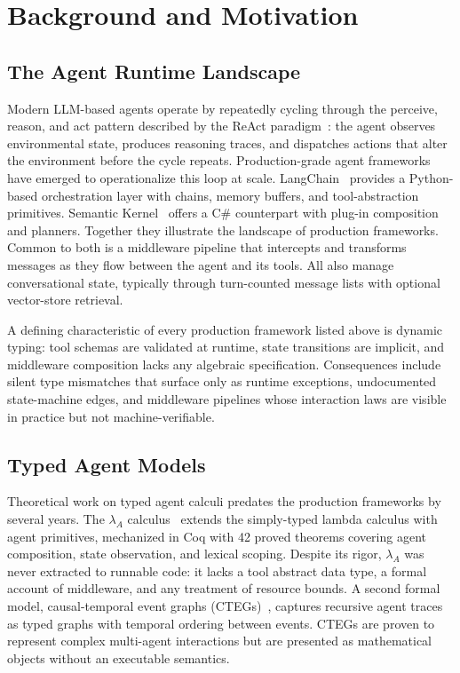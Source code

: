 \section{Background and Motivation}
\label{sec:background}

\subsection{The Agent Runtime Landscape}
\label{sec:runtime-landscape}

Modern LLM-based agents operate by repeatedly cycling through the perceive, reason, and act pattern described by the ReAct paradigm~\cite{react}: the agent observes environmental state, produces reasoning traces, and dispatches actions that alter the environment before the cycle repeats.
Production-grade agent frameworks have emerged to operationalize this loop at scale.
LangChain~\cite{langchain} provides a Python-based orchestration layer with chains, memory buffers, and tool-abstraction primitives.
Semantic Kernel~\cite{semantic-kernel} offers a C\# counterpart with plug-in composition and planners.
Together they illustrate the landscape of production frameworks.
Common to both is a middleware pipeline that intercepts and transforms messages as they flow between the agent and its tools.
All also manage conversational state, typically through turn-counted message lists with optional vector-store retrieval.

A defining characteristic of every production framework listed above is dynamic typing: tool schemas are validated at runtime, state transitions are implicit, and middleware composition lacks any algebraic specification.
Consequences include silent type mismatches that surface only as runtime exceptions, undocumented state-machine edges, and middleware pipelines whose interaction laws are visible in practice but not machine-verifiable.

\subsection{Typed Agent Models}
\label{sec:typed-models}

Theoretical work on typed agent calculi predates the production frameworks by several years.
The $\lambda_A$ calculus~\cite{lambda-a} extends the simply-typed lambda calculus with agent primitives, mechanized in Coq with 42 proved theorems covering agent composition, state observation, and lexical scoping.
Despite its rigor, $\lambda_A$ was never extracted to runnable code: it lacks a tool abstract data type, a formal account of middleware, and any treatment of resource bounds.
A second formal model, causal-temporal event graphs (CTEGs)~\cite{ctegs}, captures recursive agent traces as typed graphs with temporal ordering between events.
CTEGs are proven to represent complex multi-agent interactions but are presented as mathematical objects without an executable semantics.

